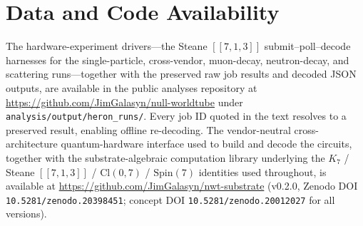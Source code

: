 \documentclass[11pt]{article}
\newcommand{\Klogical}{[[7, 1, 3]]}
\begin{document}
\section*{Data and Code Availability}

The hardware-experiment drivers---the Steane $\Klogical$ submit--poll--decode harnesses for the single-particle, cross-vendor, muon-decay, neutron-decay, and scattering runs---together with the preserved raw job results and decoded JSON outputs, are available in the public analyses repository at \url{https://github.com/JimGalasyn/null-worldtube} under \texttt{analysis/output/heron\_runs/}.  Every job ID quoted in the text resolves to a preserved result, enabling offline re-decoding.  The vendor-neutral cross-architecture quantum-hardware interface used to build and decode the circuits, together with the substrate-algebraic computation library underlying the $K_7$ / Steane $\Klogical$ / $\mathrm{Cl}(0, 7)$ / $\mathrm{Spin}(7)$ identities used throughout, is available at \url{https://github.com/JimGalasyn/nwt-substrate} (v0.2.0, Zenodo DOI \texttt{10.5281/zenodo.20398451}; concept DOI \texttt{10.5281/zenodo.20012027} for all versions).
\end{document}

